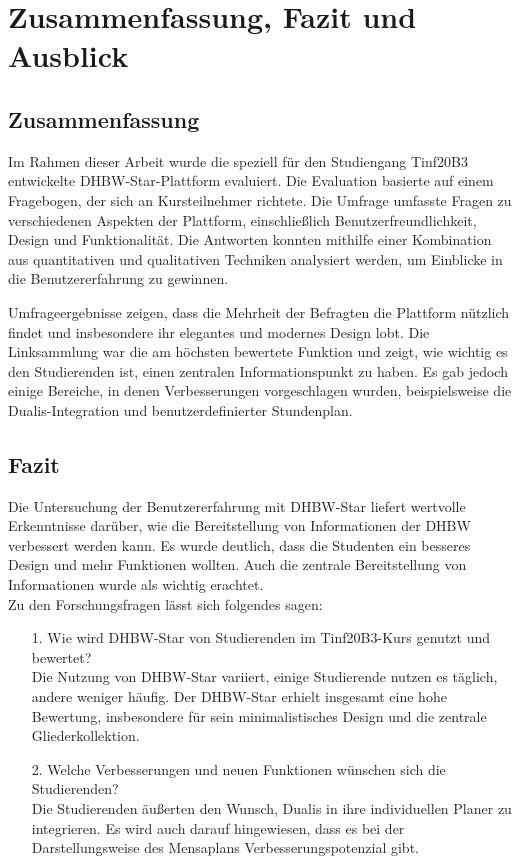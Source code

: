 \chapter{Zusammenfassung, Fazit und Ausblick}

\section{Zusammenfassung}
Im Rahmen dieser Arbeit wurde die speziell für den Studiengang Tinf20B3 entwickelte DHBW-Star-Plattform evaluiert. Die Evaluation basierte auf einem Fragebogen, der sich an Kursteilnehmer richtete. Die Umfrage umfasste Fragen zu verschiedenen Aspekten der Plattform, einschließlich Benutzerfreundlichkeit, Design und Funktionalität. Die Antworten konnten mithilfe einer Kombination aus quantitativen und qualitativen Techniken analysiert werden, um Einblicke in die Benutzererfahrung zu gewinnen.
 
Umfrageergebnisse zeigen, dass die Mehrheit der Befragten die Plattform nützlich findet und insbesondere ihr elegantes und modernes Design lobt. Die Linksammlung war die am höchsten bewertete Funktion und zeigt, wie wichtig es den Studierenden ist, einen zentralen Informationspunkt zu haben. Es gab jedoch einige Bereiche, in denen Verbesserungen vorgeschlagen wurden, beispielsweise die Dualis-Integration und benutzerdefinierter Stundenplan. 
\newpage

\section{Fazit}
Die Untersuchung der Benutzererfahrung mit DHBW-Star liefert wertvolle Erkenntnisse darüber, wie die Bereitstellung von Informationen der DHBW verbessert werden kann. Es wurde deutlich, dass die Studenten ein besseres Design und mehr Funktionen wollten. Auch die zentrale Bereitstellung von Informationen wurde als wichtig erachtet. 
\\
Zu den Forschungsfragen lässt sich folgendes sagen:
\begin{itemize}
	\item [1.] Wie wird DHBW-Star von Studierenden im Tinf20B3-Kurs genutzt und bewertet?\\
	Die Nutzung von DHBW-Star variiert, einige Studierende nutzen es täglich, andere weniger häufig. Der DHBW-Star erhielt insgesamt eine hohe Bewertung, insbesondere für sein minimalistisches Design und die zentrale Gliederkollektion. 
	\item[2.]Welche Verbesserungen und neuen Funktionen wünschen sich die Studierenden?\\
	Die Studierenden äußerten den Wunsch, Dualis in ihre individuellen Planer zu integrieren. Es wird auch darauf hingewiesen, dass es bei der Darstellungsweise des Mensaplans Verbesserungspotenzial gibt.
\end{itemize}

